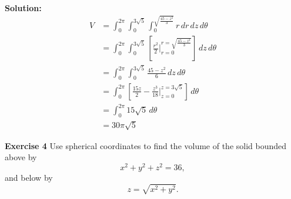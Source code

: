 \documentclass[12pt,oneside]{exam}
\newenvironment{exercise}[1]{\vspace{.1in}\noindent\textbf{Exercise #1 \hspace{.05em}}}{}
\newenvironment{newsolution}{\vspace{.1in}\noindent\textbf{Solution: \hspace{.05em}}}{}
\begin{document}
\begin{newsolution}
\begin{align*}
V & = \int_{0}^{2\pi} \int_{0}^{3\sqrt{5}} \int_{0}^{\sqrt{\frac{45-z^2}{3}}} r \, dr \, dz \, d\theta \\
& = \int_{0}^{2\pi} \int_{0}^{3\sqrt{5}} \left[ \frac{r^2}{2} \Big|_{r=0}^{r=\sqrt{\frac{45-z^2}{3}}} \right] \, dz \,d\theta \\
& = \int_{0}^{2\pi} \int_{0}^{3\sqrt{5}}\frac{45-z^2}{6} \, dz \, d\theta \\
& = \int_{0}^{2\pi}  \left[ \frac{15z}{2} - \frac{z^3}{18} \Big|_{z=0}^{z=3\sqrt{5}} \right] \, d\theta \\
& =  \int_{0}^{2\pi} 15\sqrt{5}  \, d\theta \\
& = 30\pi\sqrt{5}
\end{align*}
\end{newsolution} 

\begin{exercise}{4}
Use spherical coordinates to find the volume of the solid bounded above by 
\begin{equation*}
x^2+y^2+z^2=36,
\end{equation*}
and below by
\begin{equation*}
z=\sqrt{x^2+y^2}.
\end{equation*}
\end{exercise}
\end{document}
